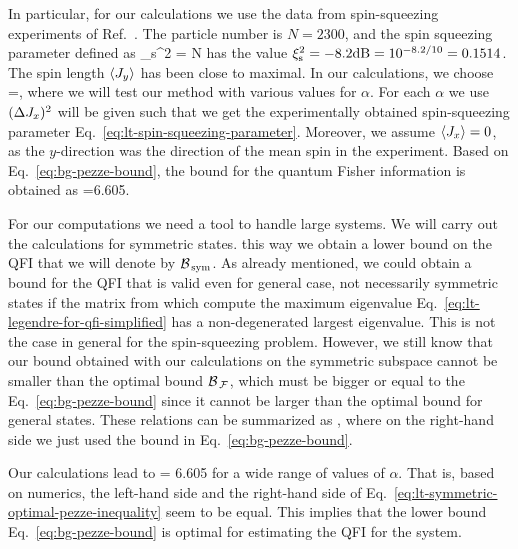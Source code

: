 In particular, for our calculations we use the data from spin-squeezing experiments of Ref.~\citep{Gross2010}.
The particle number is $N=2300$, and the spin squeezing parameter defined as
\be
  \label{eq:lt-spin-squeezing-parameter}
  \xi_{\textnormal{s}}^2 = N 
\ee
has the value $\xi_{\textnormal{s}}^2=-8.2\textnormal{dB}=10^{-8.2/10}=0.1514$.
The spin length $\langle J_y \rangle$ has been close to maximal.
In our calculations, we choose
\be
  =\alpha {},
\ee
where we will test our method with various values for $\alpha$.
For each $\alpha$ we use $(\Delta J_x )^2$ will be given such that we get the experimentally obtained spin-squeezing parameter Eq.~\eqref{eq:lt-spin-squeezing-parameter}.
Moreover, we assume $\langle J_x \rangle=0$, as the $y$-direction was the direction of the mean spin in the experiment.
Based on Eq.~\eqref{eq:bg-pezze-bound}, the bound for the quantum Fisher information is obtained as
\be
  \label{eq:lt-bound-for-experiment}
  \geq {}=6.605.
\ee

For our computations we need a tool to handle large systems.
We will carry out the calculations for symmetric states.
this way we obtain a lower bound on the QFI that we will denote by $\mathcal{B}_{\, \textnormal{sym} }$.
As already mentioned, we could obtain a bound for the QFI that is valid even for general case, not necessarily symmetric states if the matrix from which compute the maximum eigenvalue Eq.~\eqref{eq:lt-legendre-for-qfi-simplified} has a non-degenerated largest eigenvalue.
This is not the case in general for the spin-squeezing problem.
However, we still know that our bound obtained with our calculations on the symmetric subspace cannot be smaller than the optimal bound $\mathcal{B}_{\, \mathcal{F} }$, which must be bigger or equal to the Eq.~\eqref{eq:bg-pezze-bound} since it cannot be larger than the optimal bound for general states.
These relations can be summarized as
\be
  \geq {}\geq{},
\ee
where on the right-hand side we just used the bound in Eq.~\eqref{eq:bg-pezze-bound}.

Our calculations lead to
\be
  \label{eq:lt-symmetric-optimal-pezze-inequality}
   = 6.605
\ee
for a wide range of values of $\alpha$.
That is, based on numerics, the left-hand side and the right-hand side of Eq.~\eqref{eq:lt-symmetric-optimal-pezze-inequality} seem to be equal.
This implies that the lower bound Eq.~\eqref{eq:bg-pezze-bound} is optimal for estimating the QFI for the system.

